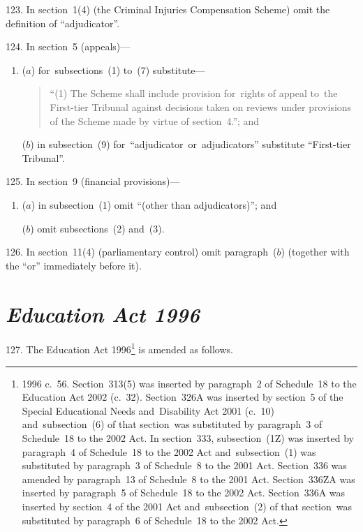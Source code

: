 \documentclass[12pt,a4paper]{article}
\begin{document}
\medskip

123.  In section~1(4) (the Criminal Injuries Compensation Scheme) omit the definition of “adjudicator”.

\medskip

124.  In section~5 (appeals)—
\begin{enumerate}\item[]
($a$) for~subsections~(1) to~(7) substitute—
\begin{quotation}
“(1) The Scheme shall include provision for~rights of appeal to~the First-tier Tribunal against decisions taken on reviews under provisions of the Scheme made by virtue of section~4.”; and
\end{quotation}

($b$) in subsection~(9) for~“adjudicator~or~adjudicators” substitute “First-tier Tribunal”.
\end{enumerate}

\medskip

125.  In section~9 (financial provisions)—
\begin{enumerate}\item[]
($a$) in subsection~(1) omit “(other than adjudicators)”; and

($b$) omit subsections~(2) and~(3).
\end{enumerate}

\medskip

126.  In section~11(4) (parliamentary control) omit paragraph~($b$)  (together with the “or” immediately before it).

\section*{\itshape Education Act 1996}

127.  The Education Act 1996\footnote{1996 c.~56. Section~313(5) was inserted by paragraph~2 of Schedule~18 to the Education Act 2002 (c.~32). Section~326A was inserted by section~5 of the Special Educational Needs and~Disability Act 2001 (c.~10) and~subsection~(6) of that section~was substituted by paragraph~3 of Schedule~18 to the 2002 Act. In section~333, subsection~(1Z) was inserted by paragraph~4 of Schedule~18 to the 2002 Act and~subsection~(1) was substituted by paragraph~3 of Schedule~8 to the 2001 Act. Section~336 was amended by paragraph~13 of Schedule~8 to the 2001 Act. Section~336ZA was inserted by paragraph~5 of Schedule~18 to the 2002 Act. Section~336A was inserted by section~4 of the 2001 Act and~subsection~(2) of that section~was substituted by paragraph~6 of Schedule~18 to the 2002 Act.} is amended as follows.
\end{document}
